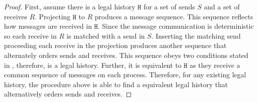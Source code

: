 \begin{proof}
First, assume there is a legal history $\mathtt{H}$ for a set of sends $\mathit{S}$ and a set of receives $\mathit{R}$. 
Projecting $\mathtt{H}$ to $\mathit{R}$ produces a message sequence. This sequence reflects how messages are received in $\mathtt{H}$. Since the message communication is deterministic so each receive in $\mathit{R}$ is matched with a send in $\mathit{S}$. Inserting the matching send proceeding each receive in the projection produces another sequence that alternately orders sends and receives. This sequence obeys two conditions stated in , therefore, is a legal history. Further, it is equivalent to $\mathtt{H}$ as they receive a common sequence of messages on each process.
Therefore, for any existing legal history, the procedure above is able to find a equivalent legal history that alternatively orders sends and receives.  
\end{proof}



 


